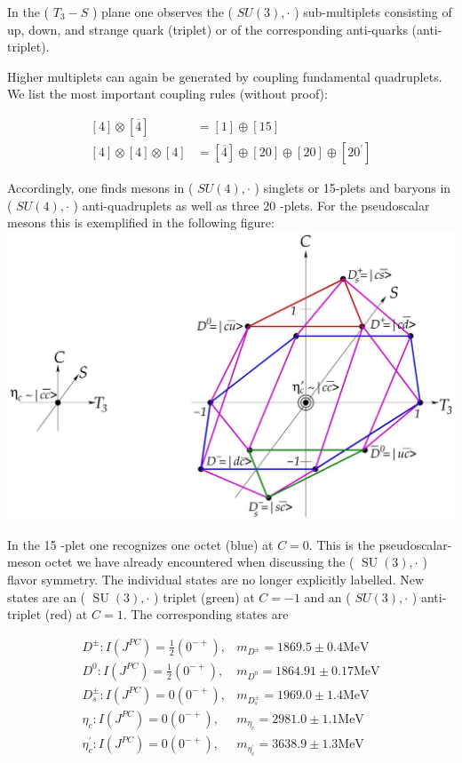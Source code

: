 \documentclass[10pt, letterpaper]{article}
\begin{document}
In the ( $T_{3}-S$ ) plane one observes the ( $S U(3), \cdot$ ) sub-multiplets consisting of up, down, and strange quark (triplet) or of the corresponding anti-quarks (anti-triplet).

Higher multiplets can again be generated by coupling fundamental quadruplets. We list the most important coupling rules (without proof):

$$
\begin{aligned}
{[4] \otimes[\overline{4}] } & =[1] \oplus[15] \\
{[4] \otimes[4] \otimes[4] } & =[\overline{4}] \oplus[20] \oplus[20] \oplus\left[20^{\prime}\right]
\end{aligned}
$$

Accordingly, one finds mesons in ( $S U(4), \cdot$ ) singlets or 15-plets and baryons in ( $S U(4), \cdot$ ) anti-quadruplets as well as three 20 -plets. For the pseudoscalar mesons this is exemplified in the following figure:\\
\includegraphics[scale=0.2, center]{2025_05_20_8618f55a41bfe980b4b2g-79}

In the 15 -plet one recognizes one octet (blue) at $C=0$. This is the pseudoscalar-meson octet we have already encountered when discussing the ( $\operatorname{SU}(3), \cdot$ ) flavor symmetry. The individual states are no longer explicitly labelled. New states are an ( $\operatorname{SU}(3), \cdot$ ) triplet (green) at $C=-1$ and an ( $S U(3), \cdot$ ) anti-triplet (red) at $C=1$. The corresponding states are

$$
\begin{aligned}
D^{ \pm}: I\left(J^{P C}\right)=\frac{1}{2}\left(0^{-+}\right), & m_{D^{ \pm}}=1869.5 \pm 0.4 \mathrm{MeV} \\
D^{0}: I\left(J^{P C}\right)=\frac{1}{2}\left(0^{-+}\right), & m_{D^{0}}=1864.91 \pm 0.17 \mathrm{MeV} \\
D_{s}^{ \pm}: I\left(J^{P C}\right)=0\left(0^{-+}\right), & m_{D_{s}^{ \pm}}=1969.0 \pm 1.4 \mathrm{MeV} \\
\eta_{c}: I\left(J^{P C}\right)=0\left(0^{-+}\right), & m_{\eta_{c}}=2981.0 \pm 1.1 \mathrm{MeV} \\
\eta_{c}^{\prime}: I\left(J^{P C}\right)=0\left(0^{-+}\right), & m_{\eta_{c}^{\prime}}=3638.9 \pm 1.3 \mathrm{MeV}
\end{aligned}
$$
\end{document}
